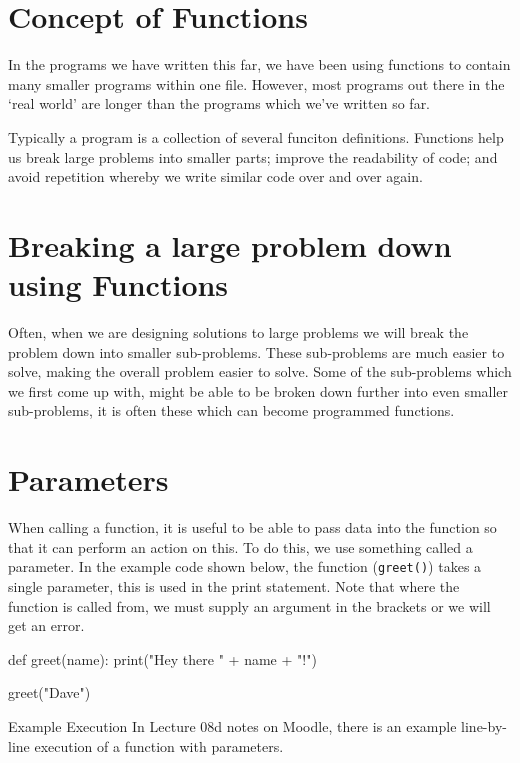 
\section*{Concept of Functions}
In the programs we have written this far, we have been using functions to contain many smaller programs within one file. However, most programs out there in the `real world' are longer than the programs which we've written so far.

Typically a program is a collection of several funciton definitions. Functions help us break large problems into smaller parts; improve the readability of code; and avoid repetition whereby we write similar code over and over again. 

\section*{Breaking a large problem down using Functions}
Often, when we are designing solutions to large problems we will break the problem down into smaller sub-problems. These sub-problems are much easier to solve, making the overall problem easier to solve. Some of the sub-problems which we first come up with, might be able to be broken down further into even smaller sub-problems, it is often these which can become programmed functions.

\section*{Parameters}
When calling a function, it is useful to be able to pass data into the function so that it can perform an action on this. To do this, we use something called a parameter. In the example code shown below, the function (\verb|greet()|) takes a single parameter, this is used in the print statement. Note that where the function is called from, we must supply an argument in the brackets or we will get an error.
\begin{python}
def greet(name):
    print("Hey there " + name + "!")

greet("Dave")
\end{python}

\begin{link}{Example Execution}
In Lecture 08d notes on Moodle, there is an example line-by-line execution of a function with parameters.
\end{link}

